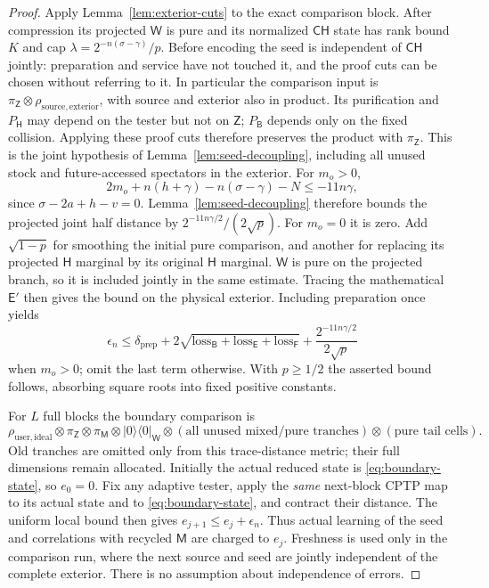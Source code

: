 \documentclass[11pt,a4paper]{article}
\numberwithin{equation}{section}
\theoremstyle{plain}
\theoremstyle{definition}
\newcommand{\rg}[1]{\mathsf{#1}}
\newcommand{\ketbra}[2]{\lvert #1 \rangle\langle #2 \rvert}
\begin{document}
\begin{proof}
Apply Lemma~\ref{lem:exterior-cuts} to the exact comparison block. After
compression its projected $\rg{W}$ is pure and its normalized
$\rg{C}\rg{H}$ state has rank bound $K$ and cap
$\lambda=2^{-n(\sigma-\gamma)}/p$. Before encoding the seed is independent of
$\rg{C}\rg{H}$ jointly: preparation and service have not touched it, and the
proof cuts can be chosen without referring to it. In particular the comparison
input is $\pi_{\rg{Z}}\otimes\rho_{\mathrm{source},\mathrm{exterior}}$, with
source and exterior also in product. Its purification and $P_{\rg{H}}$ may
depend on the tester but not on $\rg{Z}$; $P_{\rg{B}}$ depends only on the
fixed collision. Applying these proof cuts therefore preserves the product
with $\pi_{\rg{Z}}$. This is the joint hypothesis of
Lemma~\ref{lem:seed-decoupling}, including all unused stock and
future-accessed spectators in the exterior. For $m_o>0$,
\[
2m_o+n(h+\gamma)-n(\sigma-\gamma)-N\le-11n\gamma,
\]
since $\sigma-2a+h-v=0$. Lemma~\ref{lem:seed-decoupling} therefore bounds the
projected joint half distance by $2^{-11n\gamma/2}/(2\sqrt{p})$. For $m_o=0$
it is zero. Add $\sqrt{1-p}$ for smoothing the initial pure comparison, and
another for replacing its projected $\rg{H}$ marginal by its original $\rg{H}$
marginal. $\rg{W}$ is pure on the projected branch, so it is included jointly
in the same estimate. Tracing the mathematical $\rg{E}'$ then gives the bound
on the physical exterior. Including preparation once yields
\begin{equation}
\label{eq:block-error}
\epsilon_n\le\delta_{\mathrm{prep}}
+2\sqrt{\mathrm{loss}_{\rg{B}}+\mathrm{loss}_{\rg{E}}
+\mathrm{loss}_{\rg{F}}}+\frac{2^{-11n\gamma/2}}{2\sqrt{p}}
\end{equation}
when $m_o>0$; omit the last term otherwise. With $p\ge 1/2$ the asserted bound
follows, absorbing square roots into fixed positive constants.

For $L$ full blocks the boundary comparison is
\begin{equation}
\label{eq:boundary-state}
\rho_{\mathrm{user},\mathrm{ideal}}\otimes\pi_{\rg{Z}}\otimes\pi_{\rg{M}}
\otimes\ketbra{0}{0}_{\rg{W}}\otimes(\text{all unused mixed/pure tranches})
\otimes(\text{pure tail cells}).
\end{equation}
Old tranches are omitted only from this trace-distance metric; their full
dimensions remain allocated. Initially the actual reduced state is
\eqref{eq:boundary-state}, so $e_0=0$. Fix any adaptive tester, apply the
\emph{same} next-block CPTP map to its actual state and to
\eqref{eq:boundary-state}, and contract their distance. The uniform local
bound then gives $e_{j+1}\le e_j+\epsilon_n$. Thus actual learning of the seed
and correlations with recycled $\rg{M}$ are charged to $e_j$. Freshness is
used only in the comparison run, where the next source and seed are jointly
independent of the complete exterior. There is no assumption about
independence of errors.


\end{proof}
\end{document}
